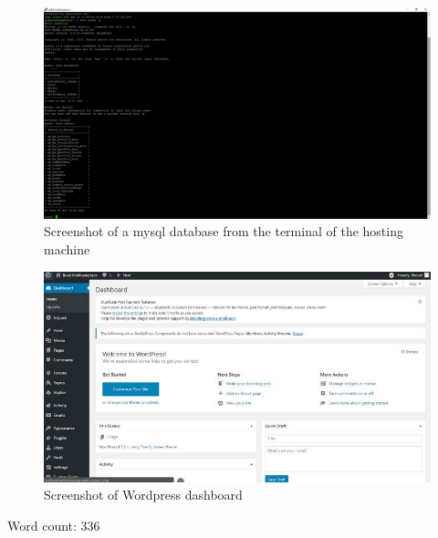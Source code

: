 \documentclass[a4paper, 12pt]{article}
\begin{document}
\begin{figure}[h!]
    \centering
    \includegraphics[width=\linewidth]{mysql.png}
    \caption{Screenshot of a mysql database from the terminal of the hosting machine}
    \label{fig:mysql}
\end{figure}

\begin{figure}[h!]
    \centering
    \includegraphics[width=\linewidth]{word.jpg}
    \caption{Screenshot of Wordpress dashboard}
    \label{fig:word}
\end{figure}

Word count: 336
\end{document}
